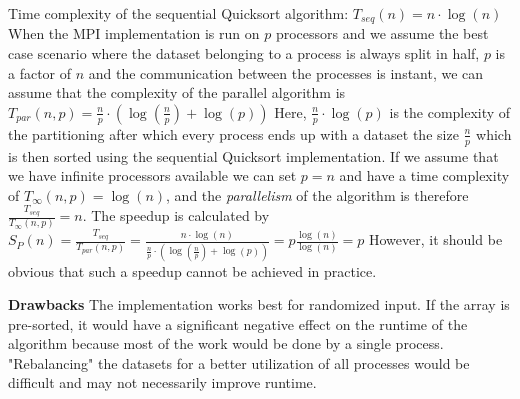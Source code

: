 \documentclass[12pt,a4paper]{article}
\begin{document}
Time complexity of the sequential Quicksort algorithm: $T_{seq}(n)=n\cdot \log(n)$\newline
When the MPI implementation is run on $p$ processors and we assume the best case scenario where the dataset belonging to a process is always split in half, $p$ is a factor of $n$ and the communication between the processes is instant, we can assume that the complexity of the parallel algorithm is $T_{par}(n,p)=\frac{n}{p}\cdot (\log(\frac{n}{p})+\log(p))$\newline
Here, $\frac{n}{p}\cdot \log(p)$ is the complexity of the partitioning after which every process ends up with a dataset the size $\frac{n}{p}$ which is then sorted using the sequential Quicksort implementation. If we assume that we have infinite processors available we can set $p=n$ and have a time complexity of $T_{\infty}(n,p)=\log(n)$, and the \emph{parallelism} of the algorithm is therefore $\frac{T_{seq}}{T_{\infty}(n,p)}=n.$\newline
The speedup is calculated by $S_P(n) = \frac{T_{seq}}{T_{par}(n,p)} = \frac{n\cdot \log(n)}{\frac{n}{p}\cdot (\log(\frac{n}{p})+\log(p))} = p\frac{\log(n)}{\log(n)} = p$\newline
However, it should be obvious that such a speedup cannot be achieved in practice.\newline

\noindent\textbf{Drawbacks}\newline
The implementation works best for randomized input. If the array is pre-sorted, it would have a significant negative effect on the runtime of the algorithm because most of the work would be done by a single process. "Rebalancing" the datasets for a better utilization of all processes would be difficult and may not necessarily improve runtime. 
\end{document}
